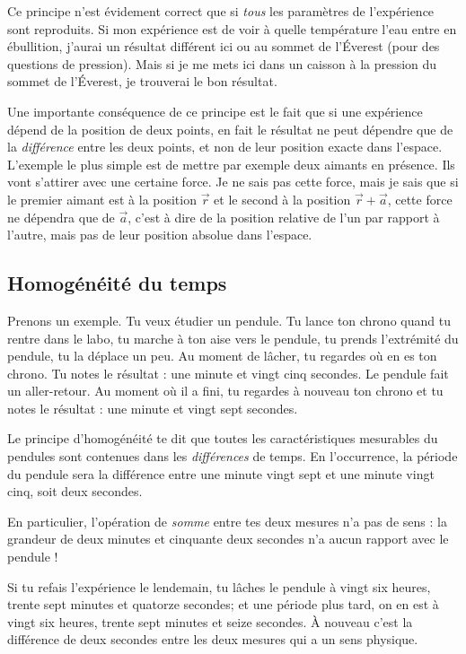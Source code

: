 \documentclass[a4paper,12pt]{book}
\theoremstyle{mes_exemples}	\newtheorem{exemple}[numtho]{Exemple}
\theoremstyle{mes_tho}
\begin{document}
Ce principe n'est évidement correct que si \emph{tous} les paramètres de l'expérience sont reproduits. Si mon expérience est de voir à quelle température l'eau entre en ébullition, j'aurai un résultat différent ici ou au sommet de l'Éverest (pour des questions de pression). Mais si je me mets ici dans un caisson à la pression du sommet de l'Éverest, je trouverai le bon résultat.

Une importante conséquence de ce principe est le fait que si une expérience dépend de la position de deux points, en fait le résultat ne peut dépendre que de la \emph{différence} entre les deux points, et non de leur position exacte dans l'espace. L'exemple le plus simple est de mettre par exemple deux aimants en présence. Ils vont s'attirer avec une certaine force. Je ne sais pas cette force, mais je sais que si le premier aimant est à la position $\overrightarrow{ r }$ et le second à la position $\overrightarrow{ r }+ \overrightarrow{ a }$, cette force ne dépendra que de $\overrightarrow{ a }$, c'est à dire de la position relative de l'un par rapport à l'autre, mais pas de leur position absolue dans l'espace.

\subsection{Homogénéité du temps}

Prenons un exemple. Tu veux étudier un pendule. Tu lance ton chrono quand tu rentre dans le labo, tu marche à ton aise vers le pendule, tu prends l'extrémité du pendule, tu la déplace un peu. Au moment de lâcher, tu regardes où en es ton chrono. Tu notes le résultat : une minute et vingt cinq secondes. Le pendule fait un aller-retour. Au moment où il a fini, tu regardes à nouveau ton chrono et tu notes le résultat : une minute et vingt sept secondes.

Le principe d'homogénéité te dit que toutes les caractéristiques mesurables du pendules sont contenues dans les \emph{différences} de temps. En l'occurrence, la période du pendule sera la différence entre une minute vingt sept et une minute vingt cinq, soit deux secondes.

En particulier, l'opération de \emph{somme} entre tes deux mesures n'a pas de sens : la grandeur de deux minutes et cinquante deux secondes n'a aucun rapport avec le pendule !

Si tu refais l'expérience le lendemain, tu lâches le pendule à vingt six heures, trente sept minutes et quatorze secondes; et une période plus tard, on en est à vingt six heures, trente sept minutes et seize secondes. À nouveau c'est la différence de deux secondes entre les deux mesures qui a un sens physique.
\end{document}
